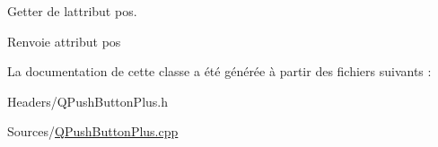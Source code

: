 Getter de l\textquotesingle{}attribut pos. 

\begin{DoxyReturn}{Renvoie}
attribut pos 
\end{DoxyReturn}


La documentation de cette classe a été générée à partir des fichiers suivants \+:\begin{DoxyCompactItemize}
\item 
Headers/Q\+Push\+Button\+Plus.\+h\item 
Sources/\hyperlink{_q_push_button_plus_8cpp}{Q\+Push\+Button\+Plus.\+cpp}\end{DoxyCompactItemize}
